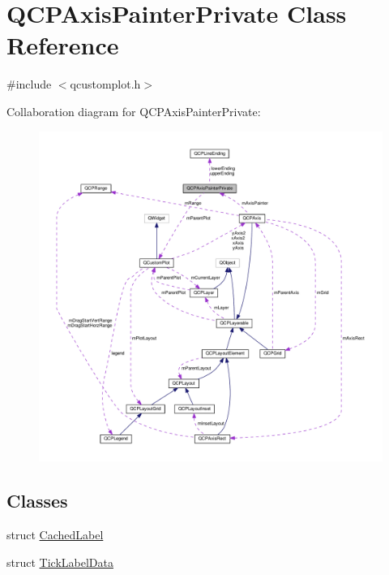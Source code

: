 \hypertarget{classQCPAxisPainterPrivate}{}\section{Q\+C\+P\+Axis\+Painter\+Private Class Reference}
\label{classQCPAxisPainterPrivate}


{\ttfamily \#include $<$qcustomplot.\+h$>$}



Collaboration diagram for Q\+C\+P\+Axis\+Painter\+Private\+:
\nopagebreak
\begin{figure}[H]
\begin{center}
\leavevmode
\includegraphics[width=350pt]{classQCPAxisPainterPrivate__coll__graph}
\end{center}
\end{figure}
\subsection*{Classes}
\begin{DoxyCompactItemize}
\item 
struct \hyperlink{structQCPAxisPainterPrivate_1_1CachedLabel}{Cached\+Label}
\item 
struct \hyperlink{structQCPAxisPainterPrivate_1_1TickLabelData}{Tick\+Label\+Data}
\end{DoxyCompactItemize}
